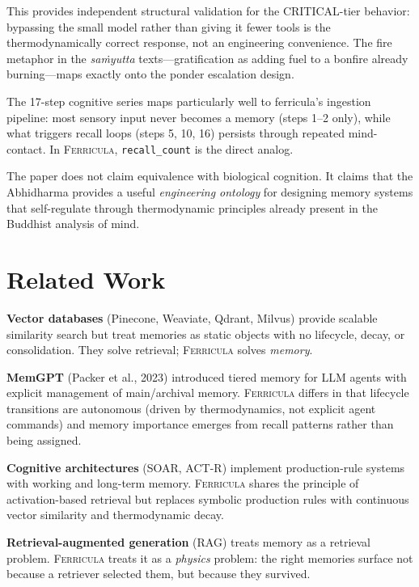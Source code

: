 \documentclass[twocolumn,10pt]{article}
\begin{document}
This provides independent structural validation for the CRITICAL-tier
behavior: bypassing the small model rather than giving it fewer tools is
the thermodynamically correct response, not an engineering convenience.
The fire metaphor in the \textit{sa\.myutta} texts---gratification as
adding fuel to a bonfire already burning---maps exactly onto the ponder
escalation design.

The 17-step cognitive series maps particularly well to ferricula's ingestion
pipeline: most sensory input never becomes a memory (steps 1--2 only),
while what triggers recall loops (steps 5, 10, 16) persists through
repeated mind-contact.  In \textsc{Ferricula}, \texttt{recall\_count} is
the direct analog.

The paper does not claim equivalence with biological cognition.
It claims that the Abhidharma provides a useful \textit{engineering
ontology} for designing memory systems that self-regulate through
thermodynamic principles already present in the Buddhist analysis
of mind.

\section{Related Work}

\textbf{Vector databases} (Pinecone, Weaviate, Qdrant, Milvus)
provide scalable similarity search but treat memories as static
objects with no lifecycle, decay, or consolidation.  They solve
retrieval; \textsc{Ferricula} solves \textit{memory}.

\textbf{MemGPT} (Packer et al., 2023) introduced tiered memory
for LLM agents with explicit management of main/archival memory.
\textsc{Ferricula} differs in that lifecycle transitions are
autonomous (driven by thermodynamics, not explicit agent commands)
and memory importance emerges from recall patterns rather than
being assigned.

\textbf{Cognitive architectures} (SOAR, ACT-R) implement
production-rule systems with working and long-term memory.
\textsc{Ferricula} shares the principle of activation-based
retrieval but replaces symbolic production rules with continuous
vector similarity and thermodynamic decay.

\textbf{Retrieval-augmented generation} (RAG) treats memory as
a retrieval problem.  \textsc{Ferricula} treats it as a
\textit{physics} problem: the right memories surface not because
a retriever selected them, but because they survived.
\end{document}
